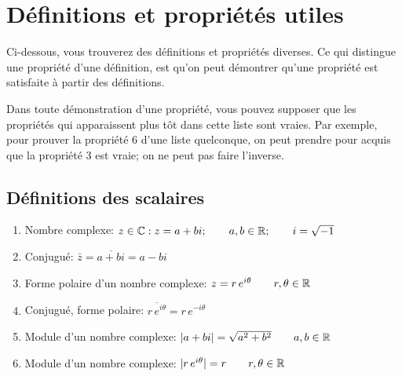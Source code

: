 \chapter{Définitions et propriétés utiles}

Ci-dessous, vous trouverez des définitions et propriétés diverses. Ce qui
distingue une propriété d'une définition, est qu'on peut démontrer qu'une propriété
est satisfaite à partir des définitions.

Dans toute démonstration d'une propriété, vous pouvez supposer que les
propriétés qui apparaissent plus tôt dans cette liste sont vraies.  Par exemple,
pour prouver la propriété 6 d'une liste quelconque, on peut prendre pour acquis que
la propriété 3 est vraie; on ne peut pas faire l'inverse.

\begin{adjmulticols}{1}{0in}{-2in}

\renewcommand{\labelenumi}{\textcolor{MainRed}{\footnotesize\thesection.\arabic{enumi}}}
\section{Définitions des scalaires}

\begin{enumerate}
\item Nombre complexe: $z\in\mathbb{C}: z = a + bi; \qquad a,b\in\mathbb{R}; \qquad i=\sqrt{-1}$
\item Conjugué: $\bar{z} = \overline{a+bi} = a-bi$
\item Forme polaire d'un nombre complexe: $z=r\,e^{i\theta}\qquad r, \theta \in \mathbb{R}$
\item Conjugué, forme polaire: $\overline{r\,e^{i\theta}} = r\,e^{-i\theta}$
\item Module d'un nombre complexe: $|a + bi| = \sqrt{a^2 + b^2} \qquad a,b \in \mathbb{R}$
\item Module d'un nombre complexe: $|r\,e^{i\theta}| = r \qquad r,\theta \in \mathbb{R}$
\end{enumerate}


\end{adjmulticols}
